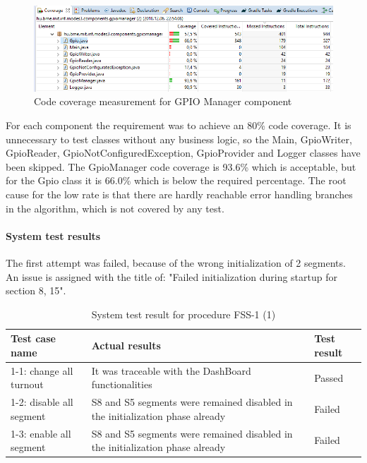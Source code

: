 \begin{figure}[ht]
	\centering
	\includegraphics[width=150mm, keepaspectratio]{figures/impl/gpioCoverage.png}
	\caption{Code coverage measurement for GPIO Manager component}
	\label{fig:gpiomanagerCoverage}
\end{figure}
For each component the requirement was to achieve an 80\% code coverage. It is unnecessary to test classes without any business logic, so the Main, GpioWriter, GpioReader, GpioNotConfiguredException, GpioProvider and Logger classes have been skipped. The GpioManager code coverage is 93.6\% which is acceptable, but for the Gpio class it is 66.0\% which is below the required percentage. The root cause for the low rate is that there are hardly reachable error handling branches in the algorithm, which is not covered by any test.

\paragraph{System test results} The first attempt was failed, because of the wrong initialization of 2 segments. An issue is assigned with the title of: "Failed initialization during startup for section 8, 15".
\begin{table}[ht]
	\caption{System test result for procedure FSS-1 (1)}
	\label{table:SystemTestProcedure-1-Result1}
	\begin{center}
		\renewcommand{\arraystretch}{1.8}
		\begin{tabu} 
			to 0.9 \textwidth
			{  X[1.5, c] X[1.5, c] X[c]  }
			\toprule
			Test case name           & Actual results                                                                & Test result \\ -1: change all turnout  & It was traceable with the DashBoard functionalities                           & Passed      \\
			1-2: disable all segment & S8 and S5 segments were remained disabled in the initialization phase already & Failed      \\
			1-3: enable all segment  & S8 and S5 segments were remained disabled in the initialization phase already & Failed      \\ \bottomrule
		\end{tabu}
	\end{center}
\end{table}

